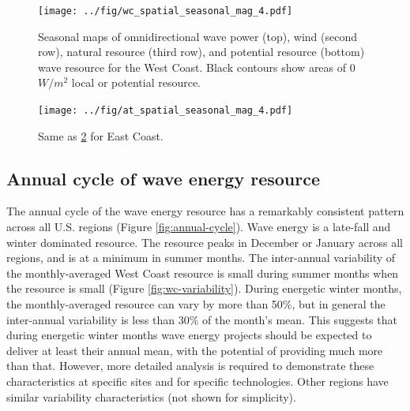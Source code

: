 \begin{figure}[ht]
  \centering
  \texttt{[image: ../fig/wc\_spatial\_seasonal\_mag\_4.pdf]}
  \caption{Seasonal maps of omnidirectional wave power (top), wind (second row), natural resource (third row), and potential resource (bottom) wave resource for the West Coast. Black contours show areas of 0 $W/m^{2}$ local or potential resource.}
  \label{fig:maps-wc}
\end{figure}

\begin{figure}[ht]
  \centering
  \texttt{[image: ../fig/at\_spatial\_seasonal\_mag\_4.pdf]}
  \caption{Same as \ref{fig:maps-at} for East Coast.}
  \label{fig:maps-at}
\end{figure}

\subsection{Annual cycle of wave energy resource}

The annual cycle of the wave energy resource has a remarkably consistent pattern across all U.S. regions (Figure \ref{fig:annual-cycle}). Wave energy is a late-fall and winter dominated resource. The resource peaks in December or January across all regions, and is at a minimum in summer months. The inter-annual variability of the monthly-averaged West Coast resource is small during summer months when the resource is small (Figure \ref{fig:wc-variability}). During energetic winter months, the monthly-averaged resource can vary by more than 50\%, but in general the inter-annual variability is less than 30\% of the month's mean. This suggests that during energetic winter months wave energy projects should be expected to deliver at least their annual mean, with the potential of providing much more than that. However, more detailed analysis is required to demonstrate these characteristics at specific sites and for specific technologies. Other regions have similar variability characteristics (not shown for simplicity).

